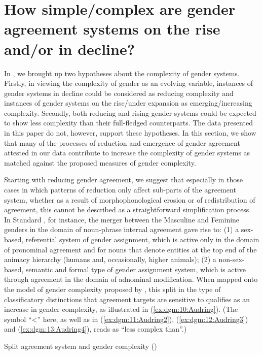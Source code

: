 \documentclass[output=collectionpaper]{langsci/langscibook}
\begin{document}
\section{How simple/complex are gender agreement systems on the rise and/or in decline?}
\label{sec:dgm:simple/compl}
In , we brought up two hypotheses about the complexity of gender systems.  Firstly, in viewing the complexity of gender as an evolving variable, instances of gender systems in decline could be considered as reducing complexity and instances of gender systems on the rise/under expansion as emerging/increasing complexity. Secondly, both reducing and rising gender systems could be expected to show less complexity than their full-fledged counterparts. The data presented in this paper do not, however, support these hypotheses. In this section, we show that many of the processes of reduction and emergence of gender agreement attested in our data contribute to increase the complexity of gender systems as matched against the proposed measures of gender complexity.


Starting with reducing gender agreement, we suggest that especially in those cases in which patterns of reduction only affect sub-parts of the agreement system, whether as a result of morphophonological erosion or of redistribution of agreement, this cannot be described as a straightforward simplification process. In Standard , for instance, the merger between the Masculine and Feminine genders in the domain of noun-phrase internal agreement gave rise to: (1) a sex-based, referential system of gender assignment, which is active only in the domain of pronominal agreement and for nouns that denote entities at the top end of the animacy hierarchy (humans and, occasionally, higher animals); (2) a non-sex-based, semantic and formal type of gender assignment system, which is active through agreement in the domain of adnominal modification. When mapped onto the model of gender complexity proposed by \citet{Audring2017},  this split in the type of classificatory distinctions that agreement targets are sensitive to qualifies as an increase in gender complexity, as illustrated in (\ref{ex:dgm:10:Audring}). (The symbol ``{\textless}'' here, as well as in (\ref{ex:dgm:11:Audring2}), (\ref{ex:dgm:12:Audring3}) and (\ref{ex:dgm:13:Audring4}), reads as ``less complex than''.)

\ea\label{ex:dgm:10:Audring}
Split agreement system and gender complexity (\citealt[adapted from][]{Audring2017})\\
\end{document}
